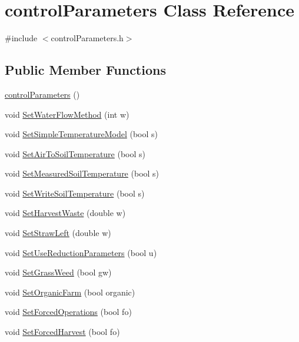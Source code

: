 \hypertarget{classcontrol_parameters}{
\section{controlParameters Class Reference}
\label{classcontrol_parameters}
}


{\ttfamily \#include $<$controlParameters.h$>$}\subsection*{Public Member Functions}
\begin{DoxyCompactItemize}
\item 
\hyperlink{classcontrol_parameters_a2acc732d4c073abc5f69df32d2aa0006}{controlParameters} ()
\item 
void \hyperlink{classcontrol_parameters_af45477e3d79e2fcc8e34848c94b74a33}{SetWaterFlowMethod} (int w)
\item 
void \hyperlink{classcontrol_parameters_a0c870fc072987d313076610284d36db8}{SetSimpleTemperatureModel} (bool s)
\item 
void \hyperlink{classcontrol_parameters_a380e78599a9b1b63d6d714e33010dab0}{SetAirToSoilTemperature} (bool s)
\item 
void \hyperlink{classcontrol_parameters_a267ebd9b1c69e4cba12fdbe9d4fb4ac6}{SetMeasuredSoilTemperature} (bool s)
\item 
void \hyperlink{classcontrol_parameters_a78a8f1dfd93321ab943ebfa1a6738a1e}{SetWriteSoilTemperature} (bool s)
\item 
void \hyperlink{classcontrol_parameters_a41e0a4ebe351184ecebbdb62664a0ff4}{SetHarvestWaste} (double w)
\item 
void \hyperlink{classcontrol_parameters_a53e0b5bcf58eea96908fd3b974e4dd15}{SetStrawLeft} (double w)
\item 
void \hyperlink{classcontrol_parameters_ab3723111e5bbd3b9a8784182b39f8a36}{SetUseReductionParameters} (bool u)
\item 
void \hyperlink{classcontrol_parameters_a63237c5736c6740c5b9c80f0542b81b8}{SetGrassWeed} (bool gw)
\item 
void \hyperlink{classcontrol_parameters_a52407c9d80f3f391105c8cd6b04cc409}{SetOrganicFarm} (bool organic)
\item 
void \hyperlink{classcontrol_parameters_ac7145a68ee259d6219773c15895732b7}{SetForcedOperations} (bool fo)
\item 
void \hyperlink{classcontrol_parameters_a968c37e5b24dc3db6bc6027399cc0af2}{SetForcedHarvest} (bool fo)

\end{DoxyCompactItemize}
